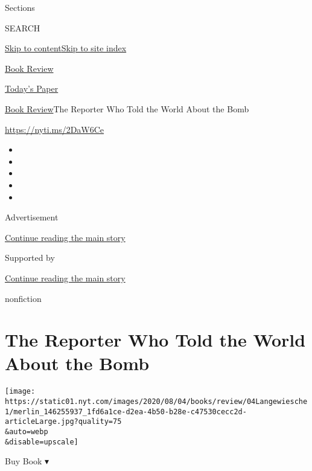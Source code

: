 Sections

SEARCH

\protect\hyperlink{site-content}{Skip to
content}\protect\hyperlink{site-index}{Skip to site index}

\href{https://www.nytimes.com/section/books/review}{Book Review}

\href{https://myaccount.nytimes.com/auth/login?response_type=cookie\&client_id=vi}{}

\href{https://www.nytimes.com/section/todayspaper}{Today's Paper}

\href{/section/books/review}{Book Review}\textbar{}The Reporter Who Told
the World About the Bomb

\url{https://nyti.ms/2DaW6Ce}

\begin{itemize}
\item
\item
\item
\item
\item
\end{itemize}

Advertisement

\protect\hyperlink{after-top}{Continue reading the main story}

Supported by

\protect\hyperlink{after-sponsor}{Continue reading the main story}

nonfiction

\hypertarget{the-reporter-who-told-the-world-about-the-bomb}{%
\section{The Reporter Who Told the World About the
Bomb}\label{the-reporter-who-told-the-world-about-the-bomb}}

\texttt{[image: https://static01.nyt.com/images/2020/08/04/books/review/04Langewiesche1/merlin\_146255937\_1fd6a1ce-d2ea-4b50-b28e-c47530cecc2d-articleLarge.jpg?quality=75\\\&auto=webp\\\&disable=upscale]}

Buy Book ▾

